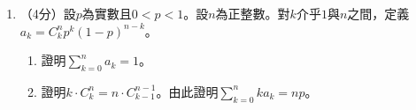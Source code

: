 \documentclass[12pt]{article}
\begin{document}
\begin{enumerate}
        \hrulefill

        \hrulefill

        \hrulefill

        \hrulefill

        \hrulefill

        \hrulefill

        \hrulefill

        \hrulefill

        \hrulefill

        \hrulefill

        \hrulefill

        \hrulefill
        \item （4分）設$p$為實數且$0<p<1$。設$n$為正整數。對$k$介乎$1$與$n$之間，定義$a_k=C_k^n p^k(1-p)^{n-k}$。\begin{enumerate}
            \item 證明$\displaystyle\sum_{k=0}^{n}a_k=1$。
            \item 證明$k\cdot C_k^n=n\cdot C_{k-1}^{n-1}$。由此證明$\displaystyle\sum_{k=0}^{n}ka_k=np$。
        \end{enumerate}

        \hrulefill

        \hrulefill

        \hrulefill

        \hrulefill

        \hrulefill

        \hrulefill

        \hrulefill

        \hrulefill

        \hrulefill

        \hrulefill

        \hrulefill

        \hrulefill

        \hrulefill

        \hrulefill

        \hrulefill

        \hrulefill

        \hrulefill

        \hrulefill

        \hrulefill

        \hrulefill

        \hrulefill

        \hrulefill

        \hrulefill


\end{enumerate}
\end{document}
